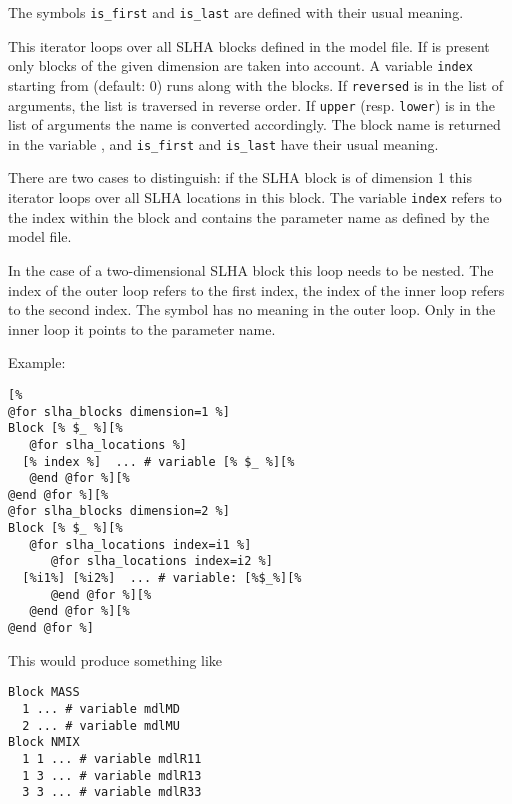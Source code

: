 \documentclass[11pt,a4paper]{refrep}
\begin{document}
\begin{description}
\begin{description}
   \end{description}
   The symbols \texttt{is\_first} and \texttt{is\_last} are defined with
   their usual meaning.
\item[\texttt{slha\_blocks}
   {[\texttt{shift=}\synt{shift}]}
   {[\texttt{dimension=}\synt{dim: 1,2}]}
   {[\texttt{reversed}]}
   {[\texttt{upper|lower}]}
] This iterator loops over all SLHA blocks defined in the model file.
  If  is present only blocks of the given dimension
  are taken into account. A variable \texttt{index} starting from
   (default: 0) runs along with the blocks.
  If \texttt{reversed} is in the list of arguments, the list is traversed
  in reverse order. If \texttt{upper} (resp. \texttt{lower}) is in the
  list of arguments the name is converted accordingly. The block name
  is returned in the variable \lit{\$\_}, and \texttt{is\_first}
  and \texttt{is\_last} have their usual meaning.
\item[\texttt{slha\_entries}
   {[\texttt{upper|lower}]}
] There are two cases to distinguish: if the SLHA block is of dimension 1
  this iterator loops over all SLHA locations in this block.
  The variable \texttt{index} refers to the index within the block
  and \lit{\$\_} contains the parameter name as defined by the model file.

  In the case of a two-dimensional SLHA block this loop needs to be
  nested. The index of the outer loop refers to the first index,
  the index of the inner loop refers to the second index.
  \attention{} The symbol \lit{\$\_} has no meaning in the outer loop.
  Only in the inner loop it points to the parameter name.

  Example:
\begin{lstlisting}
[%
@for slha_blocks dimension=1 %]
Block [% $_ %][%
   @for slha_locations %]
  [% index %]  ... # variable [% $_ %][%
   @end @for %][%
@end @for %][%  
@for slha_blocks dimension=2 %]
Block [% $_ %][%
   @for slha_locations index=i1 %]
      @for slha_locations index=i2 %]
  [%i1%] [%i2%]  ... # variable: [%$_%][%
      @end @for %][%
   @end @for %][%
@end @for %]
\end{lstlisting}

  This would produce something like
\begin{lstlisting}
Block MASS
  1 ... # variable mdlMD
  2 ... # variable mdlMU
Block NMIX
  1 1 ... # variable mdlR11
  1 3 ... # variable mdlR13
  3 3 ... # variable mdlR33
\end{lstlisting}
\end{description}
\end{document}
